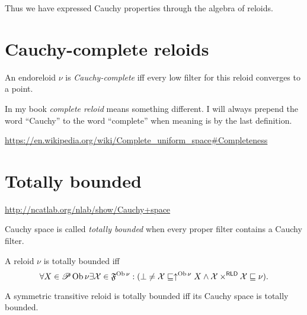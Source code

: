 Thus we have expressed Cauchy properties through the algebra of reloids.

\section{Cauchy-complete reloids}

\begin{defn}
  An endoreloid $\nu$ is \emph{Cauchy-complete} iff every low filter for
  this reloid converges to a point.
\end{defn}

\begin{rem}
  In my book \cite{volume-1} \emph{complete reloid} means something
  different. I will always prepend the word ``Cauchy'' to the word
  ``complete'' when meaning is by the last definition.
\end{rem}

\url{https://en.wikipedia.org/wiki/Complete\_uniform\_space\#Completeness}

\section{Totally bounded}

\url{http://ncatlab.org/nlab/show/Cauchy+space}

\begin{defn}
  Cauchy space is called \emph{totally bounded} when every proper filter
  contains a Cauchy filter.
\end{defn}

\begin{obvious}
A reloid $\nu$ is totally bounded iff
\[ \forall X \in \mathscr{P} \operatorname{Ob} \nu \exists \mathcal{X} \in
   \mathfrak{F}^{\operatorname{Ob} \nu} : (\bot \neq \mathcal{X} \sqsubseteq
   \uparrow^{\operatorname{Ob} \nu} X \wedge \mathcal{X} \times^{\mathsf{RLD}}
   \mathcal{X} \sqsubseteq \nu) . \]
\end{obvious}

\begin{thm}
  A symmetric transitive reloid is totally bounded iff its Cauchy space is
  totally bounded.
\end{thm}

